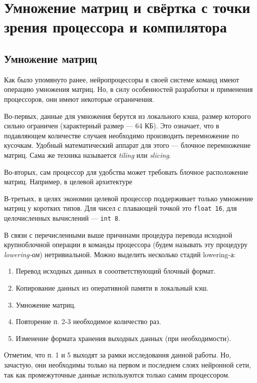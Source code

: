 \section{Умножение матриц и свёртка с точки зрения процессора и компилятора}
\label{sec:Chapter3} 

\subsection{Умножение матриц}

Как было упомянуто ранее, нейропроцессоры в своей системе команд имеют
операцию умножения матриц. Но, в силу особенностей разработки и
применения процессоров, они имеют некоторые ограничения.

Во-первых, данные для умножения берутся из локального кэша, размер
которого сильно ограничен (характерный размер --- 64 КБ). Это означает,
что в подавляющем количестве случаев необходимо производить перемножение
по кусочкам. Удобный математический аппарат для этого --- блочное
перемножение матриц. Сама же техника называется \textit{tiling} или \textit{slicing}.

Во-вторых, сам процессор для удобства может требовать блочное расположение
матриц. Например, в целевой архитектуре

В-третьих, в целях экономии целевой процессор поддерживает только умножение
матриц у коротких типов. Для чисел с плавающей точкой это \texttt{float 16},
для целочисленных вычислений --- \texttt{int 8}.

В связи с перечисленными выше причинами процедура перевода исходной
крупноблочной операции в команды процессора (будем называть эту процедуру
\textit{lowering-ом}) нетривиальной. Можно выделить несколько стадий lowering-а:

\begin{enumerate}
    \item Перевод исходных данных в сооответствующий блочный формат.
    \item Копирование данных из оперативной памяти в локальный кэш.
    \item Умножение матриц.
    \item Повторение п. 2-3 необходимое количество раз.
    \item Изменение формата хранения выходных данных (при необходимости).
\end{enumerate}

Отметим, что п. 1 и 5 выходят за рамки исследования данной работы.
Но, зачастую, они необходимы только на первом и последнем слоях нейронной сети,
так как промежуточные данные используются только самим процессором.

